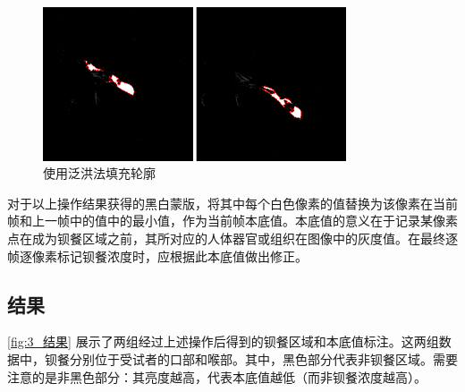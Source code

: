 \begin{figure}[!htp]
    \centering
    \includegraphics[width=0.8\textwidth]{figures/3_5.png}
    \caption{使用泛洪法填充轮廓}
    \label{fig:3_5_泛洪}
\end{figure}

对于以上操作结果获得的黑白蒙版，将其中每个白色像素的值替换为该像素在当前帧和上一帧中的值中的最小值，作为当前帧本底值。本底值的意义在于记录某像素点在成为钡餐区域之前，其所对应的人体器官或组织在图像中的灰度值。在最终逐帧逐像素标记钡餐浓度时，应根据此本底值做出修正。

\subsection{结果}

\cref{fig:3_结果} 展示了两组经过上述操作后得到的钡餐区域和本底值标注。这两组数据中，钡餐分别位于受试者的口部和喉部。其中，黑色部分代表非钡餐区域。需要注意的是非黑色部分：其亮度越高，代表本底值越低（而非钡餐浓度越高）。


